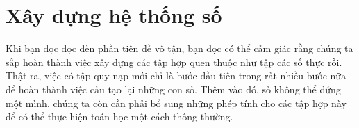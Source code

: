 \chapter{Xây dựng hệ thống số}

Khi bạn đọc đọc đến phần tiên đề vô tận, bạn đọc có thể cảm giác rằng chúng ta sắp hoàn thành việc xây dựng các tập hợp quen thuộc như tập các số thực rồi. Thật ra, việc có tập quy nạp mới chỉ là bước đầu tiên trong rất nhiều bước nữa để hoàn thành việc cấu tạo lại những con số. Thêm vào đó, số không thể đứng một mình, chúng ta còn cần phải bổ sung những phép tính cho các tập hợp này để có thể thực hiện toán học một cách thông thường.


